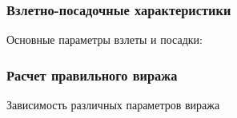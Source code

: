 \documentclass{beamer}
\begin{document}
\begin{frame}[t]
    \frametitle{Взлетно-посадочные характеристики}
    \vfill
    \begin{center}
        Основные параметры взлеты и посадки:
        
    \end{center}
    \vfill
\end{frame}

\begin{frame}[t]
    \frametitle{Расчет правильного виража}
    \begin{center}
        Зависимость различных параметров виража
        \resizebox{.79\linewidth}{!}{}
    \end{center}
\end{frame}
\end{document}
